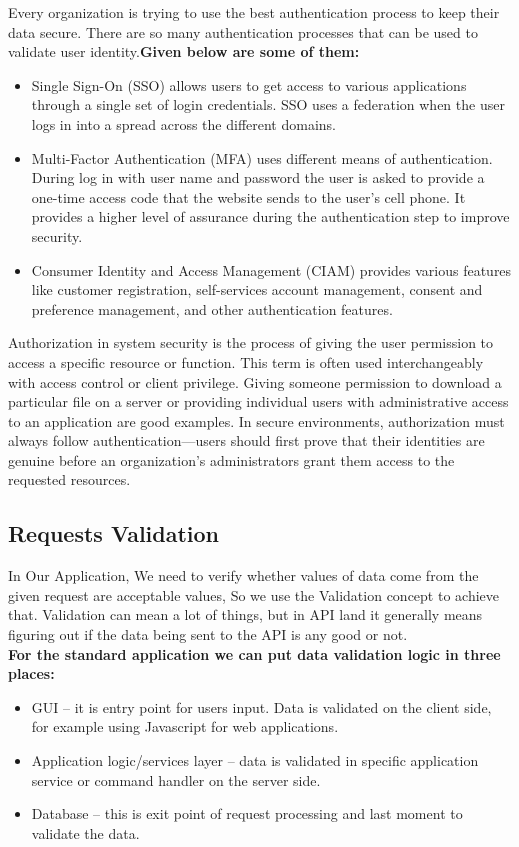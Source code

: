 Every organization is trying to use the best authentication process to keep their data secure. There are so many authentication processes that can be used to validate user identity.\textbf{Given below are some of them:}
\begin{itemize}
    \item Single Sign-On (SSO) allows users to get access to various applications through a single set of login credentials. SSO uses a federation when the user logs in into a spread across the different domains. 
    \item Multi-Factor Authentication (MFA) uses different means of authentication. During log in with user name and password the user is asked to provide a one-time access code that the website sends to the user’s cell phone. It provides a higher level of assurance during the authentication step to improve security.
    \item Consumer Identity and Access Management (CIAM) provides various features like customer registration, self-services account management, consent and preference management, and other authentication features.\cite{web006}
\end{itemize}

Authorization in system security is the process of giving the user permission to access a specific resource or function. This term is often used interchangeably with access control or client privilege. Giving someone permission to download a particular file on a server or providing individual users with administrative access to an application are good examples. In secure environments, authorization must always follow authentication—users should first prove that their identities are genuine before an organization’s administrators grant them access to the requested resources.\cite{web007}

\subsection{Requests Validation}
\hspace{2cm}In Our Application, We need to verify whether values of data come from the given request are acceptable values, So we use the Validation concept to achieve that.
Validation can mean a lot of things, but in API land it generally means figuring out if the data being sent to the API is any good or not.\\
\textbf{For the standard application we can put data validation logic in three places:}
 \begin{itemize}
    \item GUI – it is entry point for users input. Data is validated on the client side, for example using Javascript for web applications.
    \item Application logic/services layer – data is validated in specific application service or command handler on the server side.
    \item Database – this is exit point of request processing and last moment to validate the data.
\end{itemize}

